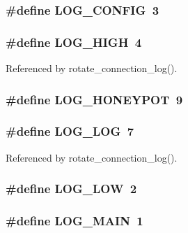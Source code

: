 \subsubsection[{LOG\_\-CONFIG}]{\setlength{\rightskip}{0pt plus 5cm}\#define LOG\_\-CONFIG~3}\label{log_8h_009fd3c675aa694038eb49bb70abe3a2}


\subsubsection[{LOG\_\-HIGH}]{\setlength{\rightskip}{0pt plus 5cm}\#define LOG\_\-HIGH~4}\label{log_8h_2ef305a344642bd0b097995b314c145f}




Referenced by rotate\_\-connection\_\-log().
\subsubsection[{LOG\_\-HONEYPOT}]{\setlength{\rightskip}{0pt plus 5cm}\#define LOG\_\-HONEYPOT~9}\label{log_8h_3fc8ad1feedce35117f5e6bad20d5f6b}


\subsubsection[{LOG\_\-LOG}]{\setlength{\rightskip}{0pt plus 5cm}\#define LOG\_\-LOG~7}\label{log_8h_6d4dfa49b8511837f24daec3339f73b8}




Referenced by rotate\_\-connection\_\-log().
\subsubsection[{LOG\_\-LOW}]{\setlength{\rightskip}{0pt plus 5cm}\#define LOG\_\-LOW~2}\label{log_8h_773ce4735da5e1fff3b2d8276f387c66}


\subsubsection[{LOG\_\-MAIN}]{\setlength{\rightskip}{0pt plus 5cm}\#define LOG\_\-MAIN~1}\label{log_8h_484ab975ea26b5cbc838f52c10bb06d0}


